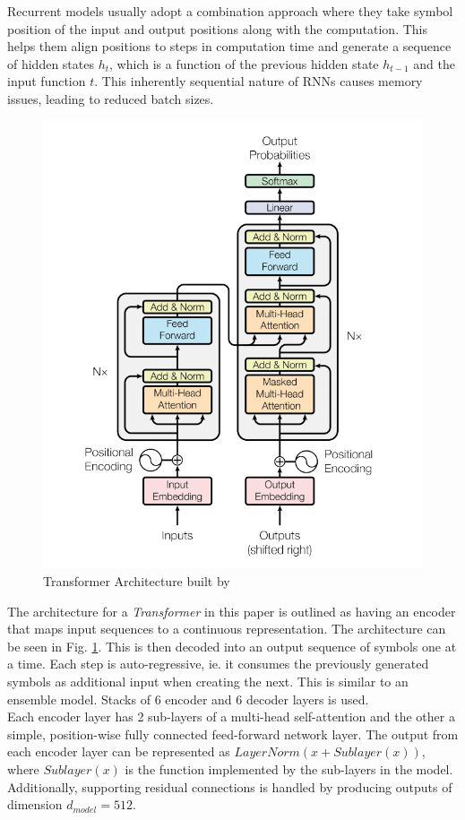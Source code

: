 \documentclass[a4paper,12pt]{report}
\begin{document}
	        Recurrent models usually adopt a combination approach where they take symbol position of the input and output positions along with the computation. This helps them align positions to steps in computation time and generate a sequence of hidden states $ h_{t} $, which is a function of the previous hidden state $ h_{t-1}$ and the input function $ t $.  This inherently sequential nature of RNNs causes memory issues, leading to reduced batch sizes. \\
			\begin{figure}[h!]
				\centering
				\includegraphics[scale=0.4]{../images/transformer.png}
				\caption{Transformer Architecture built by \citep{atayl}}\label{transformerArchitecture}
			\end{figure}
			The architecture for a \textit{Transformer} in this paper is outlined as having an encoder that maps input sequences to a continuous representation. The architecture can be seen in Fig. \ref{transformerArchitecture}. This is then decoded into an output sequence of symbols one at a time. Each step is auto-regressive, ie. it consumes the previously generated symbols as additional input when creating the next. This is similar to an ensemble model. Stacks of 6 encoder and 6 decoder layers is used.\\
			Each encoder layer has 2 sub-layers of a multi-head self-attention and the other a simple, position-wise fully connected feed-forward network layer. The output from each encoder layer can be represented as $  LayerNorm(x + Sublayer(x)) $, where $ Sublayer(x) $ is the function implemented by the sub-layers in the model. Additionally, supporting residual connections is handled by producing outputs of dimension $ d_{model}=512 $.
\end{document}
